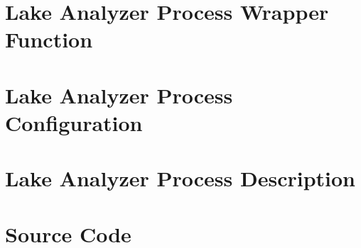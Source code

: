 
\lstset{%
  numberstyle=\ttfamily\footnotesize,
  basicstyle=\ttfamily\footnotesize\mdseries\singlespacing,
}

\chapter{Lake Analyzer Process Wrapper Function}
\label{appendix:lakeanalyzer:wrapper}


\chapter{Lake Analyzer Process Configuration}
\label{appendix:lakeanalyzer:configuration}


\chapter{Lake Analyzer Process Description}
\label{appendix:lakeanalyzer:description}




\chapter{Source Code}

